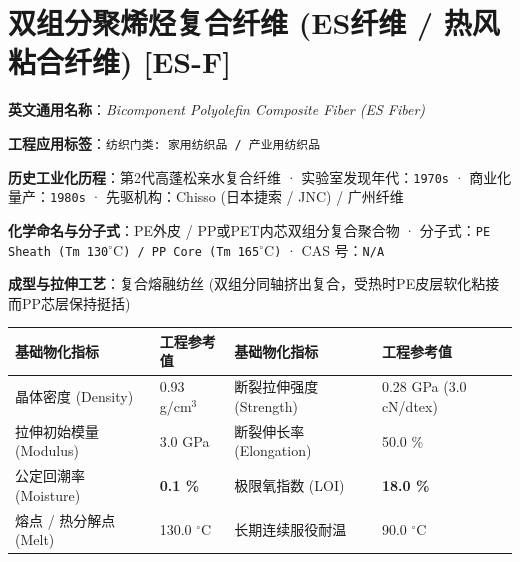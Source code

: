 \documentclass[11pt,openright,twoside,UTF8]{ctexbook}
\begin{document}
\section{双组分聚烯烃复合纤维 (ES纤维 / 热风粘合纤维) [ES-F]}
\label{sec:es-f}

\noindent\textbf{英文通用名称}：\textit{Bicomponent Polyolefin Composite Fiber (ES Fiber)}\par
\noindent\textbf{工程应用标签}：\texttt{纺织门类: 家用纺织品 / 产业用纺织品}\par
\noindent\textbf{历史工业化历程}：第2代高蓬松亲水复合纤维 · 实验室发现年代：\texttt{1970s} · 商业化量产：\texttt{1980s} · 先驱机构：Chisso (日本捷索 / JNC) / 广州纤维\par
\noindent\textbf{化学命名与分子式}：PE外皮 / PP或PET内芯双组分复合聚合物 · 分子式：\texttt{PE Sheath (Tm 130$^\circ\mathrm{C}$) / PP Core (Tm 165$^\circ\mathrm{C}$)} · CAS 号：\texttt{N/A}\par
\noindent\textbf{成型与拉伸工艺}：复合熔融纺丝 (双组分同轴挤出复合，受热时PE皮层软化粘接而PP芯层保持挺括)\par

\vspace{0.15cm}
\begin{center}
\small
\begin{tabularx}{\textwidth}{p{3.8cm}Xp{3.8cm}X}
\toprule
\textbf{基础物化指标} & \textbf{工程参考值} & \textbf{基础物化指标} & \textbf{工程参考值} \\
\midrule
晶体密度 (Density) & 0.93 g/cm$^3$ & 断裂拉伸强度 (Strength) & 0.28 GPa (3.0 cN/dtex) \\
拉伸初始模量 (Modulus) & 3.0 GPa & 断裂伸长率 (Elongation) & 50.0 \% \\
公定回潮率 (Moisture) & \textbf{0.1 \%} & 极限氧指数 (LOI) & \textbf{18.0 \%} \\
熔点 / 热分解点 (Melt) & 130.0 $^\circ\mathrm{C}$ & 长期连续服役耐温 & 90.0 $^\circ\mathrm{C}$ \\
\bottomrule
\end{tabularx}
\end{center}
\vspace{0.15cm}
\end{document}
